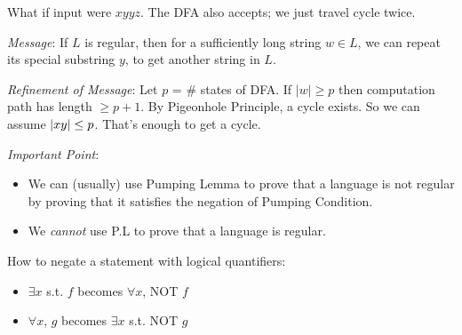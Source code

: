 What if input were $xyyz$. The DFA also accepts; we just travel cycle twice.

\emph{Message}: If $L$ is regular, then for a sufficiently long string $w \in L$, we can repeat its special substring $y$, to get another string in $L$.

\emph{Refinement of Message}: Let $p$ = \# states of DFA. If $|w| \geq p$ then computation path has length $\geq p + 1$. By Pigeonhole Principle, a cycle exists. So we can assume $\left | xy \right | \leq p$. That's enough to get a cycle.

\emph{Important Point}:

\begin{itemize}
  \item We can (usually) use Pumping Lemma to prove that a language is not regular by proving that it satisfies the negation of Pumping Condition.
  \item We \emph{cannot} use P.L to prove that a language is regular.
\end{itemize}

How to negate a statement with logical quantifiers:

\begin{itemize}
  \item $\exists x$ s.t. $f$ becomes $\forall x$, NOT $f$
  \item $\forall x$, $g$ becomes $\exists x$ s.t. NOT $g$
\end{itemize}
